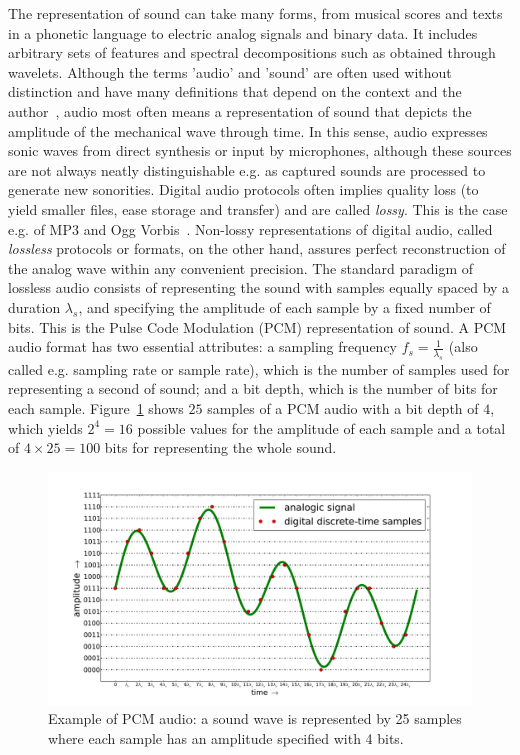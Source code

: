 The representation of sound can take many forms,
from musical scores and texts in a phonetic language to electric analog signals and binary data.
It includes arbitrary sets of features and spectral decompositions such as obtained through wavelets.
Although the terms 'audio' and 'sound' are often used without distinction
and have many definitions that depend on the context and the author~\cite{audioSound},
audio most often means a representation of sound that
depicts the amplitude of the mechanical wave through time.
In this sense,
audio expresses sonic waves from direct synthesis or input by microphones,
although these sources are not always neatly distinguishable
e.g. as captured sounds are processed to generate new sonorities.
Digital audio protocols often implies quality loss (to yield smaller files, ease storage and transfer)
and are called \emph{lossy}.
This is the case e.g. of MP3 and Ogg Vorbis~\cite{loss}.
Non-lossy representations of digital audio, called \emph{lossless} protocols or formats,
on the other hand, assures perfect reconstruction of the analog wave within any convenient precision.
The standard paradigm of lossless audio consists of
representing the sound with samples equally spaced
by a duration $\lambda_s$, and specifying the amplitude of each sample by a fixed number of bits.
This is the Pulse Code Modulation (PCM) representation of sound.
A PCM audio format has two essential attributes:
a sampling frequency $f_s=\frac{1}{\lambda_s}$ (also called e.g. sampling rate or sample rate),
which is the number of samples used for representing a second of sound;
and a bit depth, which is the number of bits for each sample.
Figure~\ref{fig:PCM} shows $25$ samples of a PCM audio with a bit depth of $4$,
which yields $2^4=16$ possible values for the amplitude of each sample
and a total of $4 \times 25= 100$ bits for representing the whole sound.

\begin{figure}
    \centering
        \includegraphics[width=.7\textwidth]{figures/pcm}
	\caption{Example of PCM audio:
	a sound wave is represented by 25 samples where each sample has an amplitude specified with 4 bits.}
        \label{fig:PCM}
\end{figure}

